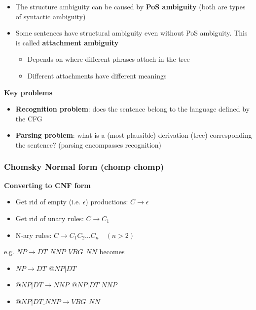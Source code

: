 \documentclass[landscape, 8pt]{extarticle}
\begin{document}
\begin{multicols}{3}
\begin{itemize}
    \setlength\itemsep{0em}
    \item The structure ambiguity can be caused by \textbf{PoS ambiguity} (both are types of syntactic ambiguity)
    \item Some sentences have structural ambiguity even without PoS ambiguity. This is called \textbf{attachment ambiguity}
        \begin{itemize}
            \setlength\itemsep{0em}
            \item Depends on where different phrases attach in the tree
            \item Different attachments have different meanings
        \end{itemize}
\end{itemize}

\textbf{Key problems}
\begin{itemize}
    \setlength\itemsep{0em}
    \item \textbf{Recognition problem}: does the sentence belong to the language defined by the CFG
    \item \textbf{Parsing problem}: what is a (most plausible) derivation (tree) corresponding the sentence? (parsing encompasses recognition)
\end{itemize}

\subsubsection{Chomsky Normal form (chomp chomp)}

\textbf{Converting to CNF form}
\begin{itemize}
    \setlength\itemsep{0em}
    \item Get rid of empty (i.e. $\epsilon$) productions: $C \to \epsilon$
    \item Get rid of unary rules: $C \to C_{1}$
    \item N-ary rules: $C\to C_{1} C_{2} \dots C_{n} \quad(n > 2)$
\end{itemize}

e.g. $NP \to DT \hspace{5pt} NNP \hspace{5pt} VBG \hspace{5pt} NN$
becomes
\begin{itemize}
    \setlength\itemsep{0em}
    \item $NP \to DT\hspace{5pt} @NP|DT$
    \item $@NP|DT \to N NP \hspace{5pt} @NP | DT\_N NP$
    \item $@NP | DT\_N NP \to VBG \hspace{5pt} N N$
\end{itemize}


\end{multicols}
\end{document}
